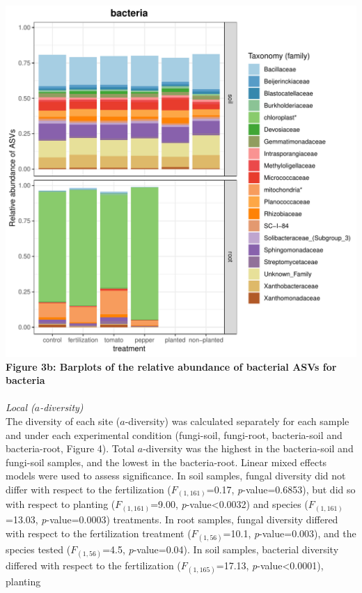 \documentclass[11pt,]{article}
\begin{document}
\includegraphics[width=7.29167in]{../figures/Figure4_FAMILY_barplots_bacteria.pdf}\\
\textbf{Figure 3b: Barplots of the relative abundance of bacterial ASVs
for bacteria}\\
\hspace*{0.333em} ~\\
\emph{Local (\(a\)-diversity)}\\
The diversity of each site (\(a\)-diversity) was calculated separately
for each sample and under each experimental condition (fungi-soil,
fungi-root, bacteria-soil and bacteria-root, Figure 4). Total
\(a\)-diversity was the highest in the bacteria-soil and fungi-soil
samples, and the lowest in the bacteria-root. Linear mixed effects
models were used to assess significance. In soil samples, fungal
diversity did not differ with respect to the fertilization
(\(F_{(1,161)}\)=0.17, \emph{p}-value=0.6853), but did so with respect
to planting (\(F_{(1,161)}\)=9.00, \emph{p}-value\textless{}0.0032) and
species (\(F_{(1,161)}\)=13.03, \emph{p}-value=0.0003) treatments. In
root samples, fungal diversity differed with respect to the
fertilization treatment (\(F_{(1,56)}\)=10.1, \emph{p}-value=0.003), and
the species tested (\(F_{(1,56)}\)=4.5, \emph{p}-value=0.04). In soil
samples, bacterial diversity differed with respect to the fertilization
(\(F_{(1,165)}\)=17.13, \emph{p}-value\textless{}0.0001), planting
\end{document}

